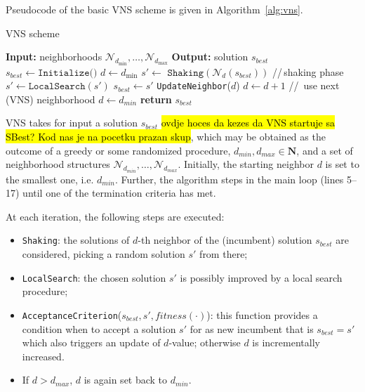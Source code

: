 \documentclass[dvipsnames,format=sigconf,anonymous=true,review=true]{acmart}
\begin{document}
  Pseudocode of the basic VNS scheme is given in Algorithm~\ref{alg:vns}.
  
     \begin{algorithm}[!t] 
  	\caption{VNS scheme}\label{alg:vns}
  	\begin{algorithmic}[1]
  		\STATE \textbf{Input:} neighborhoods  $\mathcal{N}_{d_{\min}},\ldots, \mathcal{N}_{d_{\max}}$ 
  		\STATE \textbf{Output:}   solution $s_{best}$
  		\STATE  $s_{best} \gets \texttt{Initialize()}$ 
  		\STATE $d \gets  d_{\min}$
  		\STATE  $s' \gets$  $\texttt{Shaking}(\mathcal{N}_d(s_{best}))$ \hspace{0.3cm}//\,shaking phase
  		\STATE $s' \gets  \texttt{LocalSearch}(s {'})$
  	    \STATE $s _{best}\gets s'$
  	 	\STATE \texttt{UpdateNeighbor}($d$) %
  		\ELSE 
  		\STATE $d \gets d + 1$ \hspace{0.3cm}//\, use next (VNS) neighborhood
  		\STATE $d\gets d_{min}$
  		\ENDIF
  		\ENDIF
  		\ENDWHILE
  		\STATE \textbf{return} $s_{best}$
  	\end{algorithmic}
  \end{algorithm}

VNS takes for input a solution $s_{best}$ \hl{ovdje hoces da kezes da VNS startuje sa SBest? Kod nas je na pocetku prazan skup}, which may be obtained as the outcome of a greedy or some randomized procedure, $d_{min}, d_{max} \in \mathbf{N}$, 
  and a set of neighborhood structures $\mathcal{N}_{d_{min}}, \ldots, \mathcal{N}_{d_{max}}$.  
  Initially, the starting neighbor $d$ is set to the smallest one, i.e. $d_{min}$. Further, the algorithm steps in the main loop (lines 5--17) until one of the termination criteria has met.
 
   At each iteration, the following steps are executed: %
  
  \begin{itemize}
  	\item \texttt{Shaking}: the solutions of $d$-th neighbor of the (incumbent) solution $s_{best}$ are considered, picking a random solution $s'$ from there;
  	\item  \texttt{LocalSearch}: the chosen solution $s'$ is possibly improved by a local search procedure;
  	\item \texttt{AcceptanceCriterion}($s_{best}, s', fitness(\cdot)$):  this function provides a condition when to accept a solution $s'$ for as new incumbent that is $s_{best} = s'$ which also triggers an update of $d$-value; otherwise $d$ is incrementally increased. 
  	\item  If $d> d_{max}$, $d$ is again set back to $d_{min}$.
   \end{itemize}
    
\end{document}
